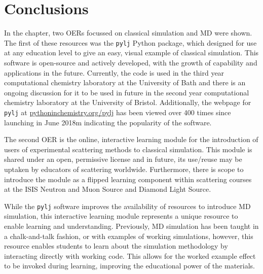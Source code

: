 \section{Conclusions}
In the chapter, two OERs focussed on classical simulation and MD were shown.
The first of these resources was the \texttt{pylj} Python package, which designed for use at any education level to give an easy, visual example of classical simulation.
This software is open-source and actively developed, with the growth of capability and applications in the future.
Currently, the code is used in the third year computational chemistry laboratory at the University of Bath and there is an ongoing discussion for it to be used in future in the second year computational chemistry laboratory at the University of Bristol.
Additionally, the webpage for \texttt{pylj} at \href{https://pythoninchemistry.org/pylj}{pythoninchemistry.org/pylj} has been viewed over 400 times since launching in June 2018m indicating the popularity of the software.

The second OER is the online, interactive learning module for the introduction of users of experimental scattering methods to classical simulation.
This module is shared under an open, permissive license and in future, its use/reuse may be uptaken by educators of scattering worldwide.
Furthermore, there is scope to introduce the module as a flipped learning component\autocite{noauthor_flipped_nodate} within scattering courses at the ISIS Neutron and Muon Source and Diamond Light Source.

While the \texttt{pylj} software improves the availability of resources to introduce MD simulation, this interactive learning module represents a unique resource to enable learning and understanding.
Previously, MD simulation has been taught in a chalk-and-talk fashion, or with examples of working simulations, however, this resource enables students to learn about the simulation methodology by interacting directly with working code.
This allows for the worked example effect to be invoked during learning, improving the educational power of the materials.
